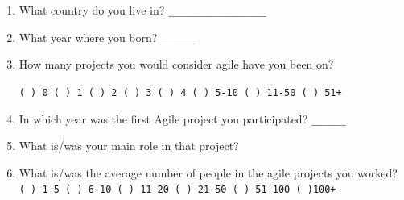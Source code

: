 \documentclass[lnbip]{svmultln}
\begin{document}
\begin{enumerate}
\item What country do you live in? \verb=_________________=
  \vspace{8pt}

\item What year where you born? \verb=______= \vspace{8pt}

\item How many projects you would consider agile have you been on?

  \verb=( ) 0 ( ) 1 ( ) 2 ( ) 3 ( ) 4 ( ) 5-10 ( ) 11-50 ( ) 51+=
  \vspace{8pt}

\item In which year was the first Agile project you participated?
  \verb=______= \vspace{8pt}

\item What is/was your main role in that project?
  \vspace{8pt}

\item What is/was the average number of people in the agile
  projects you worked?
  \verb=( ) 1-5 ( ) 6-10 ( ) 11-20 ( ) 21-50 ( ) 51-100 ( )100+=
  \vspace{8pt}


\end{enumerate}
\end{document}
